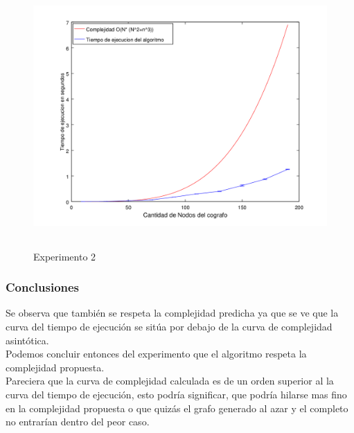             \begin{figure}[H]
      \includegraphics[height=10cm]{graficos/ejercicio3-exp2.png}
       \caption{Experimento 2}
	\end{figure}
        
     	\subsubsection*{Conclusiones}\;
        Se observa que también se respeta la complejidad predicha ya que se ve que la curva del tiempo de ejecución se sitúa por debajo de la curva de complejidad asintótica.\\
        Podemos concluir entonces del experimento que el algoritmo respeta la complejidad propuesta.\\
Pareciera  que la curva de complejidad calculada es de un orden superior al la curva del tiempo de ejecución, esto podría significar, que podría hilarse mas fino en la complejidad propuesta o que quizás el grafo generado al azar y el completo no entrarían dentro del peor caso.









